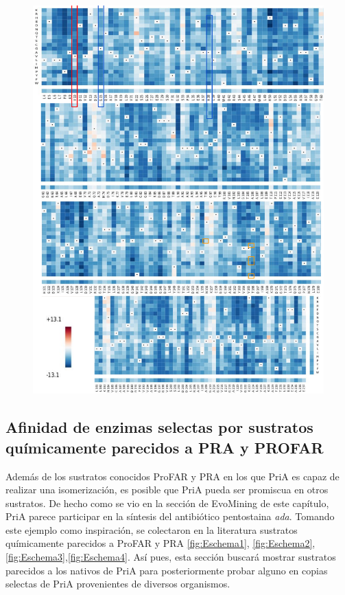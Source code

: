 \documentclass[]{article}
\begin{document}
{\begin{figure}[h!tbp]
\centering
\includegraphics[angle = 0,scale = .8]{chapter4/Couplings/PriAMutations.pdf}
\caption[Tendencia de mutaciones observada en secuencias de PriA]{\footnotesize{}}
\label{fig:CouplingsMutationsPriA}
\end{figure}

\subsection{Afinidad de enzimas selectas por sustratos químicamente
parecidos a PRA y
PROFAR}\label{afinidad-de-enzimas-selectas-por-sustratos-quimicamente-parecidos-a-pra-y-profar}

Además de los sustratos conocidos ProFAR y PRA en los que PriA es capaz
de realizar una isomerización, es posible que PriA pueda ser promiscua
en otros sustratos. De hecho como se vio en la sección de EvoMining de
este capítulo, PriA parece participar en la síntesis del antibiótico
pentostaina \emph{ada}. Tomando este ejemplo como inspiración, se
colectaron en la literatura sustratos químicamente parecidos a ProFAR y
PRA \autoref{fig:Eschema1},
\autoref{fig:Eschema2},\autoref{fig:Eschema3},\autoref{fig:Eschema4}.
Así pues, esta sección buscará mostrar sustratos parecidos a los nativos
de PriA para posteriormente probar alguno en copias selectas de PriA
provenientes de diversos organismos.

}
\end{document}
